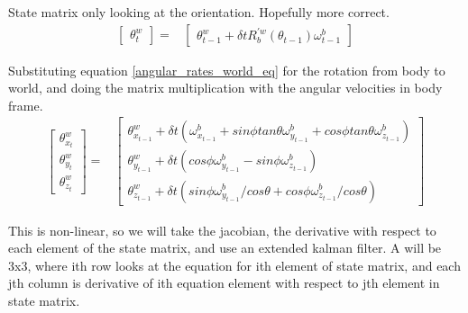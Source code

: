 \documentclass[conference]{IEEEtran}
\begin{document}
State matrix only looking at the orientation. Hopefully more correct.
\begin{align}
\begin{bmatrix} 
\theta_{t}^{w}\end{bmatrix} =& \begin{bmatrix} 
\theta_{t-1}^{w} + \delta t R_b^{\prime w}(\theta_{t-1}) \omega_{t-1}^b \end{bmatrix} \nonumber
\end{align}

Substituting equation \ref{angular_rates_world_eq} for the rotation from body to world, and doing the matrix multiplication with the angular velocities in body frame.
\begin{align}
\begin{bmatrix} 
\theta_{x_{t}}^{w}\\
\theta_{y_{t}}^{w}\\
\theta_{z_{t}}^{w}\end{bmatrix} =& \begin{bmatrix} 
\theta_{x_{t-1}}^{w} + \delta t (\omega_{x_{t-1}}^b + sin\phi tan \theta \omega_{y_{t-1}}^b + cos\phi tan\theta \omega_{z_{t-1}}^b) \\
\theta_{y_{t-1}}^{w} + \delta t (cos\phi \omega_{y_{t-1}}^b - sin\phi \omega_{z_{t-1}}^b) \\
\theta_{z_{t-1}}^{w} + \delta t (sin\phi  \omega_{y_{t-1}}^b / cos \theta + cos\phi \omega_{z_{t-1}}^b  / cos\theta) \end{bmatrix} \nonumber
\end{align}

This is non-linear, so we will take the jacobian, the derivative with respect to each element of the state matrix, and use an extended kalman filter. A will be 3x3, where ith row looks at the equation for ith element of state matrix, and each jth column is derivative of ith equation element with respect to jth element in state matrix.
\end{document}
